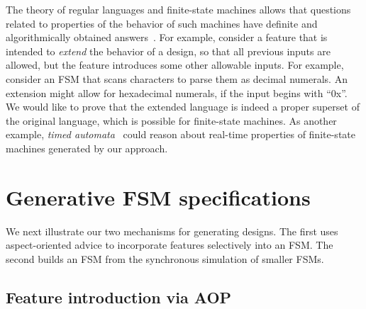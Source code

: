\documentclass[sigplan,anonymous,review]{acmart}
\begin{document}
The theory of regular languages and finite-state machines allows that questions related to properties of the behavior of such machines have definite and algorithmically obtained answers~\cite{sipser}. For example, consider a feature that is intended to \emph{extend} the behavior of a design, so that all previous inputs are allowed, but the feature introduces some other allowable inputs. For example, consider an FSM that scans characters to parse them as decimal numerals.  An extension might allow for hexadecimal numerals, if the input begins with ``0x''.  We would like to prove that the extended language is indeed a proper superset of the original language, which is possible for finite-state machines.  As another example, \emph{timed automata}~\cite{10.1145/2518102} could reason about real-time properties of finite-state machines generated by our approach.

\section{Generative FSM specifications}

We next illustrate our two mechanisms for generating designs.  The first uses aspect-oriented advice to incorporate features selectively into an FSM.  The second builds an FSM from the synchronous simulation of smaller FSMs.

\subsection{Feature introduction via AOP}\label{sec:vend}
\end{document}
